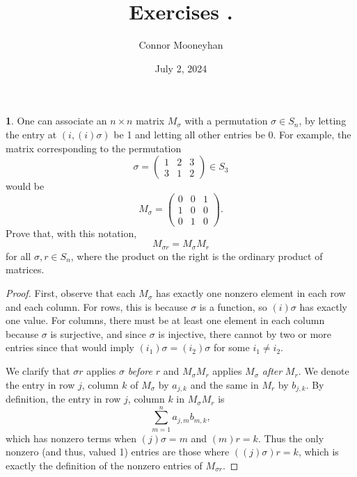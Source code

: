 \documentclass{article}
\title{Exercises {\Roman{chapter}}.{\arabic{section}}}
\author{Connor Mooneyhan}
\date{July 2, 2024}
\theoremstyle{definition}
\newtheorem{ex}{}[section]
\begin{document}
\maketitle

\begin{ex}
	One can associate an $n \times n$ matrix $M_\sigma$ with a permutation $\sigma \in S_n$, by letting the entry at $(i, (i)\sigma)$ be 1 and letting all other entries be 0.
	For example, the matrix corresponding to the permutation \begin{equation*}
		\sigma = \begin{pmatrix*}
			1 & 2 & 3 \\
			3 & 1 & 2
		\end{pmatrix*} \in S_3
	\end{equation*}
	would be \begin{equation*}
		M_\sigma = \begin{pmatrix*}
			0 & 0 & 1 \\
			1 & 0 & 0 \\
			0 & 1 & 0
		\end{pmatrix*}.
	\end{equation*}
	Prove that, with this notation, \begin{equation*}
		M_{\sigma r} = M_\sigma M_r
	\end{equation*}
	for all $\sigma, r \in S_n$, where the product on the right is the ordinary product of matrices.
\end{ex}
\begin{proof}
	First, observe that each $M_\sigma$ has exactly one nonzero element in each row and each column.
	For rows, this is because $\sigma$ is a function, so $(i)\sigma$ has exactly one value.
	For columns, there must be at least one element in each column because $\sigma$ is surjective, and since $\sigma$ is injective, there cannot by two or more entries since that would imply $(i_1)\sigma = (i_2)\sigma$ for some $i_1 \neq i_2$.

	We clarify that $\sigma r$ applies $\sigma$ \textit{before} $r$ and $M_\sigma M_r$ applies $M_\sigma$ \textit{after} $M_r$.
	We denote the entry in row $j$, column $k$ of $M_\sigma$ by $a_{j,k}$ and the same in $M_r$ by $b_{j, k}$.
	By definition, the entry in row $j$, column $k$ in $M_\sigma M_r$ is \begin{equation*}
		\sum_{m = 1}^n a_{j, m}b_{m, k},
	\end{equation*}
	which has nonzero terms when $(j)\sigma = m$ and $(m)r = k$.
	Thus the only nonzero (and thus, valued 1) entries are those where $((j)\sigma)r = k$, which is exactly the definition of the nonzero entries of $M_{\sigma r}$.
\end{proof}
\end{document}
